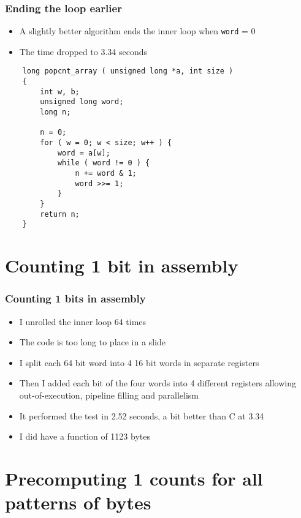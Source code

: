 \documentclass{beamer}
\begin{document}
\begin{frame}[fragile]
    \frametitle{Ending the loop earlier}
\small
    \begin{itemize}
        \item A slightly better algorithm ends the inner loop when {\tt word} = 0
        \item The time dropped to 3.34 seconds
    \end{itemize}
\begin{verbatim}
    long popcnt_array ( unsigned long *a, int size )
    {
        int w, b;
        unsigned long word;
        long n;
    
        n = 0;
        for ( w = 0; w < size; w++ ) {
            word = a[w];
            while ( word != 0 ) {
                n += word & 1;
                word >>= 1;
            }
        }
        return n;
    }
\end{verbatim}
\end{frame}

\section{Counting 1 bit in assembly}

\begin{frame}[fragile]
    \frametitle{Counting 1 bits in assembly}
    \begin{itemize}
        \item I unrolled the inner loop 64 times
        \item The code is too long to place in a slide
        \item I split each 64 bit word into 4 16 bit words in separate registers
        \item Then I added each bit of the four words into 4 different registers
              allowing out-of-execution, pipeline filling and parallelism
        \item It performed the test in 2.52 seconds, a bit better than C at 3.34
        \item I did have a function of 1123 bytes
    \end{itemize}
\end{frame}

\section{Precomputing 1 counts for all patterns of bytes}
\end{document}
